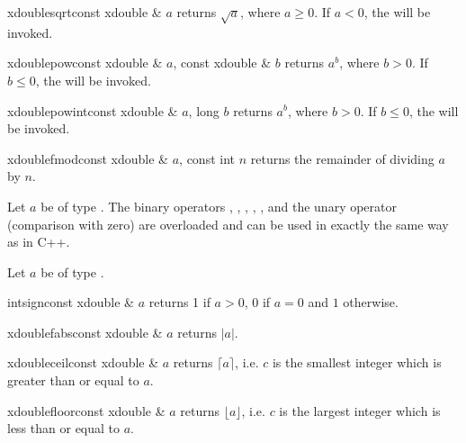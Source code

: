 \begin{fcode}{xdouble}{sqrt}{const xdouble & $a$}
  returns $\sqrt{a}$, where $a \geq 0$.  If $a < 0$, the \LEH will be invoked.
\end{fcode}

\begin{fcode}{xdouble}{pow}{const xdouble & $a$, const xdouble & $b$}
  returns $a^b$, where $b > 0$.  If $b \leq 0$, the \LEH will be invoked.
\end{fcode}

\begin{fcode}{xdouble}{powint}{const xdouble & $a$, long $b$}
  returns $a^b$, where $b > 0$.  If $b \leq 0$, the \LEH will be invoked.
\end{fcode}

\begin{fcode}{xdouble}{fmod}{const xdouble & $a$, const int $n$}
  returns the remainder of dividing $a$ by $n$.
\end{fcode}



\COMP

Let $a$ be of type .  The binary operators \code{==}, \code{!=}, \code{>=},
\code{<=}, \code{>}, \code{<} and the unary operator \code{!} (comparison with zero) are
overloaded and can be used in exactly the same way as in C++.



\BASIC

Let $a$ be of type .

\begin{fcode}{int}{sign}{const xdouble & $a$}
  returns 1 if $a > 0$, $0$ if $a = 0$ and $1$ otherwise.
\end{fcode}

\begin{fcode}{xdouble}{fabs}{const xdouble & $a$}
  returns $|a|$.
\end{fcode}

\begin{fcode}{xdouble}{ceil}{const xdouble & $a$}
  returns $\lceil a \rceil$, i.e. $c$ is the smallest integer which is greater than or equal to
  $a$.
\end{fcode}

\begin{fcode}{xdouble}{floor}{const xdouble & $a$}
  returns $\lfloor a \rfloor$, i.e. $c$ is the largest integer which is less than or equal to
  $a$.
\end{fcode}


